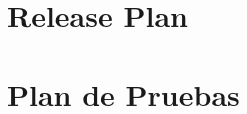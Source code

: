 \documentclass[onehalfspace]{USB}
\begin{document}




%
% 
% 

\renewcommand\bibname{REFERENCIAS}

\appendix



\chapter{Release Plan}
% 


\chapter{Plan de Pruebas}

\end{document}
